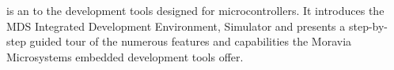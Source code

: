 
 is an  to the  development tools designed for microcontrollers.
It introduces the MDS Integrated Development Environment, Simulator and
presents a step-by-step guided tour of the numerous features and capabilities
the Moravia Microsystems embedded development tools offer.
